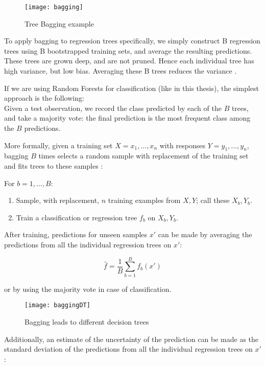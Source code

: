 \begin{figure}[H]
	\centering
	\texttt{[image: bagging]}
	\caption{Tree Bagging example \cite{bagging}}
	\label{fig:bagging}
\end{figure}

To apply bagging to regression trees specifically, we simply construct B regression trees using B bootstrapped training sets, and average the resulting predictions. These trees are grown deep, and are not pruned. Hence each individual tree has high variance, but low bias. Averaging these B trees reduces the variance \cite{ISLR}.

If we are using Random Forests for classification (like in this thesis), the simplest approach is the following: \\
Given a test observation, we record the class predicted by each of the $B$ trees, and take a majority vote: the final prediction is the most frequent class among the $B$ predictions.

More formally, given a training set $X = x_1, \dots, x_n$ with responses $Y = y_1, \dots, y_n$, bagging $B$ times selects a random sample with replacement of the training set and fits trees to these samples \cite{wiki:randomforest}:

For $b = 1, \dots, B$:
\begin{enumerate}[noitemsep]
	\item Sample, with replacement, $n$ training examples from $X, Y$; call these $X_b, Y_b$.
	\item Train a classification or regression tree $f_b$ on $X_b, Y_b$.
\end{enumerate}

After training, predictions for unseen samples $x'$ can be made by averaging the predictions from all the individual regression trees on $x'$:

\begin{equation}
{{\hat {f}}={\frac {1}{B}}\sum _{b=1}^{B}f_{b}(x')}
\end{equation}

or by using the majority vote in case of classification.

\begin{figure}[H]
	\centering
	\texttt{[image: baggingDT]}
	\caption{Bagging leads to different decision trees \cite{baggingDT}}
	\label{fig:baggingDT}
\end{figure}

Additionally, an estimate of the uncertainty of the prediction can be made as the standard deviation of the predictions from all the individual regression trees on $x'$:


